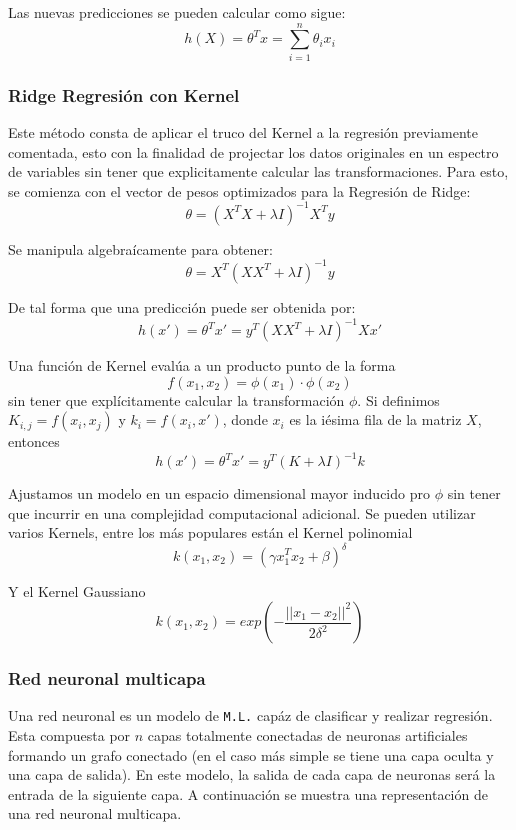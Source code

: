 {Las nuevas predicciones se pueden calcular como sigue: $$h(X) = \theta^Tx=\sum_{i=1}^{n} \theta_ix_i$$

\subsubsection*{Ridge Regresión con Kernel}

Este método consta de aplicar el truco del Kernel a la regresión previamente comentada, esto con la finalidad de projectar los datos originales en un espectro de variables sin tener que explicitamente calcular las transformaciones. Para esto, se comienza con el vector de pesos optimizados para la Regresión de Ridge: $$\theta = (X^TX+\lambda I)^{-1} X^T y$$

Se manipula algebraícamente para obtener: $$\theta = X^T(XX^T + \lambda I)^{-1}y$$

De tal forma que una predicción puede ser obtenida por: $$h(x') = \theta^Tx' = y^T(XX^T + \lambda I)^{-1}Xx'$$

Una función de Kernel evalúa a un producto punto de la forma $$f(x_1,x_2) = \phi (x_1)\cdot \phi (x_2)$$ sin tener que explícitamente calcular la transformación $\phi$. Si definimos $K_{i,j}=f(x_i,x_j)$ y $k_i = f(x_i,x')$, donde $x_i$ es la iésima fila de la matriz $X$, entonces $$h(x') = \theta^Tx' = y^T(K + \lambda I)^{-1}k$$

Ajustamos un modelo en un espacio dimensional mayor inducido pro $\phi$ sin tener que incurrir en una complejidad computacional adicional. Se pueden utilizar varios Kernels, entre los más populares están el Kernel polinomial $$k(x_1,x_2)=( \gamma x_{1}^{T} x_2 + \beta)^ {\delta}$$

Y el Kernel Gaussiano $$k(x_1,x_2)=exp(-\frac{||x_1-x_2||^2}{2{\delta}^2})$$

\subsubsection*{Red neuronal multicapa}

Una red neuronal es un modelo de \texttt{M.L.} capáz de clasificar y realizar regresión. Esta compuesta por $n$ capas totalmente conectadas de neuronas artificiales formando un grafo conectado (en el caso más simple se tiene una capa oculta y una capa de salida). En este modelo, la salida de cada capa de neuronas será la entrada de la siguiente capa. A continuación se muestra una representación de una red neuronal multicapa.

}
